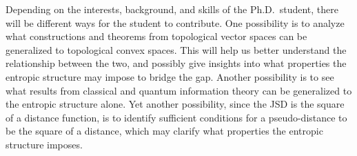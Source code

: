 Depending on the interests, background, and skills of the Ph.D.~student, there will be different ways for the student to contribute. One possibility is to analyze what constructions and theorems from topological vector spaces can be generalized to topological convex spaces. This will help us better understand the relationship between the two, and possibly give insights into what properties the entropic structure may impose to bridge the gap. Another possibility is to see what results from classical and quantum information theory can be generalized to the entropic structure alone. Yet another possibility, since the JSD is the square of a distance function, is to identify sufficient conditions for a pseudo-distance to be the square of a distance, which may clarify what properties the entropic structure imposes. 






